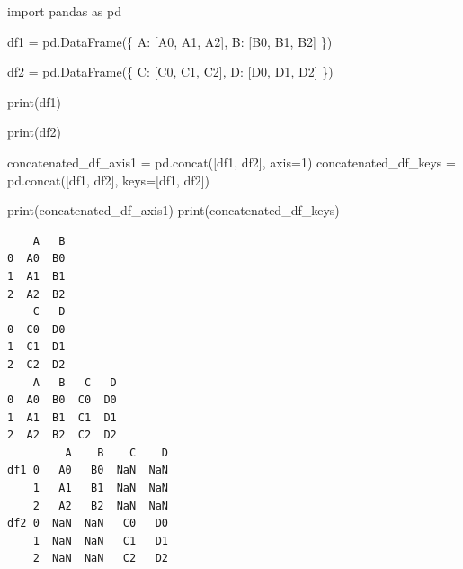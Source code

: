 \documentclass[
  polish,
  letterpaper,
  DIV=11,
  numbers=noendperiod]{scrreprt}
\newenvironment{Shaded}{\begin{snugshade}}{\end{snugshade}}
\newcommand{\BuiltInTok}[1]{\textcolor[rgb]{0.00,0.23,0.31}{#1}}
\newcommand{\DecValTok}[1]{\textcolor[rgb]{0.68,0.00,0.00}{#1}}
\newcommand{\ImportTok}[1]{\textcolor[rgb]{0.00,0.46,0.62}{#1}}
\newcommand{\NormalTok}[1]{\textcolor[rgb]{0.00,0.23,0.31}{#1}}
\newcommand{\OperatorTok}[1]{\textcolor[rgb]{0.37,0.37,0.37}{#1}}
\newcommand{\StringTok}[1]{\textcolor[rgb]{0.13,0.47,0.30}{#1}}
\begin{document}
\begin{Shaded}
\begin{Highlighting}[]
\ImportTok{import}\NormalTok{ pandas }\ImportTok{as}\NormalTok{ pd}

\NormalTok{df1 }\OperatorTok{=}\NormalTok{ pd.DataFrame(\{}
    \StringTok{\textquotesingle{}A\textquotesingle{}}\NormalTok{: [}\StringTok{\textquotesingle{}A0\textquotesingle{}}\NormalTok{, }\StringTok{\textquotesingle{}A1\textquotesingle{}}\NormalTok{, }\StringTok{\textquotesingle{}A2\textquotesingle{}}\NormalTok{],}
    \StringTok{\textquotesingle{}B\textquotesingle{}}\NormalTok{: [}\StringTok{\textquotesingle{}B0\textquotesingle{}}\NormalTok{, }\StringTok{\textquotesingle{}B1\textquotesingle{}}\NormalTok{, }\StringTok{\textquotesingle{}B2\textquotesingle{}}\NormalTok{]}
\NormalTok{\})}

\NormalTok{df2 }\OperatorTok{=}\NormalTok{ pd.DataFrame(\{}
    \StringTok{\textquotesingle{}C\textquotesingle{}}\NormalTok{: [}\StringTok{\textquotesingle{}C0\textquotesingle{}}\NormalTok{, }\StringTok{\textquotesingle{}C1\textquotesingle{}}\NormalTok{, }\StringTok{\textquotesingle{}C2\textquotesingle{}}\NormalTok{],}
    \StringTok{\textquotesingle{}D\textquotesingle{}}\NormalTok{: [}\StringTok{\textquotesingle{}D0\textquotesingle{}}\NormalTok{, }\StringTok{\textquotesingle{}D1\textquotesingle{}}\NormalTok{, }\StringTok{\textquotesingle{}D2\textquotesingle{}}\NormalTok{]}
\NormalTok{\})}

\BuiltInTok{print}\NormalTok{(df1)}

\BuiltInTok{print}\NormalTok{(df2)}

\NormalTok{concatenated\_df\_axis1 }\OperatorTok{=}\NormalTok{ pd.concat([df1, df2], axis}\OperatorTok{=}\DecValTok{1}\NormalTok{)}
\NormalTok{concatenated\_df\_keys }\OperatorTok{=}\NormalTok{ pd.concat([df1, df2], keys}\OperatorTok{=}\NormalTok{[}\StringTok{\textquotesingle{}df1\textquotesingle{}}\NormalTok{, }\StringTok{\textquotesingle{}df2\textquotesingle{}}\NormalTok{])}

\BuiltInTok{print}\NormalTok{(concatenated\_df\_axis1)}
\BuiltInTok{print}\NormalTok{(concatenated\_df\_keys)}
\end{Highlighting}
\end{Shaded}

\begin{verbatim}
    A   B
0  A0  B0
1  A1  B1
2  A2  B2
    C   D
0  C0  D0
1  C1  D1
2  C2  D2
    A   B   C   D
0  A0  B0  C0  D0
1  A1  B1  C1  D1
2  A2  B2  C2  D2
         A    B    C    D
df1 0   A0   B0  NaN  NaN
    1   A1   B1  NaN  NaN
    2   A2   B2  NaN  NaN
df2 0  NaN  NaN   C0   D0
    1  NaN  NaN   C1   D1
    2  NaN  NaN   C2   D2
\end{verbatim}
\end{document}
